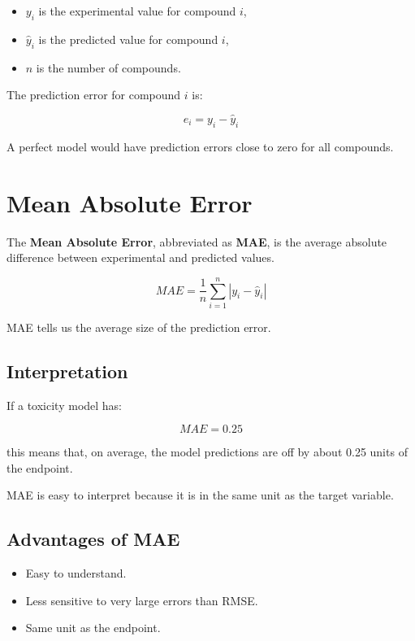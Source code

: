\documentclass[11pt]{report}
\newenvironment{Important note}{\begin{quote}\color{red}\textbf{Important note:} }{\end{quote}}
\begin{document}
\begin{itemize}[leftmargin=*]
    \item $y_i$ is the experimental value for compound $i$,
    \item $\hat{y}_i$ is the predicted value for compound $i$,
    \item $n$ is the number of compounds.
\end{itemize}

The prediction error for compound $i$ is:

\[
e_i = y_i - \hat{y}_i
\]

A perfect model would have prediction errors close to zero for all compounds.

\section{Mean Absolute Error}

The \textbf{Mean Absolute Error}, abbreviated as \textbf{MAE}, is the average absolute difference between experimental and predicted values.

\[
MAE = \frac{1}{n}\sum_{i=1}^{n}|y_i - \hat{y}_i|
\]

MAE tells us the average size of the prediction error.

\subsection*{Interpretation}

If a toxicity model has:

\[
MAE = 0.25
\]

this means that, on average, the model predictions are off by about 0.25 units of the endpoint.

MAE is easy to interpret because it is in the same unit as the target variable.

\subsection*{Advantages of MAE}

\begin{itemize}[leftmargin=*]
    \item Easy to understand.
    \item Less sensitive to very large errors than RMSE.
    \item Same unit as the endpoint.
\end{itemize}
\end{document}
